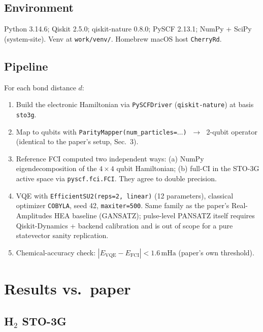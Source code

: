 \documentclass[11pt,letterpaper]{article}
\begin{document}
\subsection{Environment}
Python 3.14.6; Qiskit 2.5.0; qiskit-nature 0.8.0; PySCF 2.13.1; NumPy + SciPy (system-site). Venv at \texttt{work/venv/}. Homebrew macOS host \texttt{CherryRd}.

\subsection{Pipeline}
For each bond distance $d$:
\begin{enumerate}
\item Build the electronic Hamiltonian via \texttt{PySCFDriver} (\texttt{qiskit-nature}) at basis \texttt{sto3g}.
\item Map to qubits with \texttt{ParityMapper(num\_particles=$\ldots$)} $\;\rightarrow\;$ 2-qubit operator (identical to the paper's setup, Sec.~3).
\item Reference FCI computed two independent ways: (a) NumPy eigendecomposition of the $4\times 4$ qubit Hamiltonian; (b) full-CI in the STO-3G active space via \texttt{pyscf.fci.FCI}. They agree to double precision.
\item VQE with \texttt{EfficientSU2(reps=2, linear)} (12 parameters), classical optimizer \texttt{COBYLA}, seed 42, \texttt{maxiter=500}. Same family as the paper's Real-Amplitudes HEA baseline (GANSATZ); pulse-level PANSATZ itself requires Qiskit-Dynamics + backend calibration and is out of scope for a pure statevector sanity replication.
\item Chemical-accuracy check: $|E_\text{VQE} - E_\text{FCI}| < 1.6\,\text{mHa}$ (paper's own threshold).
\end{enumerate}

\section{Results vs.\ paper}

\subsection{H$_2$ STO-3G}
\end{document}
